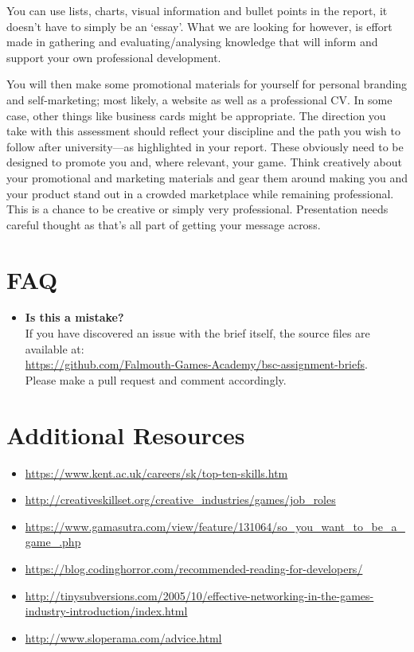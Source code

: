 \documentclass{../../fal_assignment}
\begin{document}
You can use lists, charts, visual information and bullet points in the report, it doesn't have to simply be an `essay'. What we are looking for however, is effort made in gathering and evaluating/analysing knowledge that will inform and support your own professional development.

You will then make some promotional materials for yourself for personal branding and self-marketing; most likely, a website as well as a professional CV. In some case, other things like business cards might be appropriate. The direction you take with this assessment should reflect your discipline and the path you wish to follow after university---as highlighted in your report. These obviously need to be designed to promote you and, where relevant, your game. Think creatively about your promotional and marketing materials and gear them around making you and your product stand out in a crowded marketplace while remaining professional. This is a chance to be creative or simply very professional. Presentation needs careful thought as that's all part of getting your message across.
 
\section*{FAQ}

\begin{itemize}  		
    	\item 	\textbf{Is this a mistake?} \\ 	
    		If you have discovered an issue with the brief itself, the source files are available at: \\
    		\url{https://github.com/Falmouth-Games-Academy/bsc-assignment-briefs}.\\
    		 Please make a pull request and comment accordingly.
\end{itemize}

\section*{Additional Resources}

\begin{itemize}
    \item \url{https://www.kent.ac.uk/careers/sk/top-ten-skills.htm}
    \item \url{http://creativeskillset.org/creative_industries/games/job_roles}
    \item \url{https://www.gamasutra.com/view/feature/131064/so_you_want_to_be_a_game_.php}
    \item \url{https://blog.codinghorror.com/recommended-reading-for-developers/}
    \item \url{http://tinysubversions.com/2005/10/effective-networking-in-the-games-industry-introduction/index.html}
    \item \url{http://www.sloperama.com/advice.html}
\end{itemize}
\end{document}
